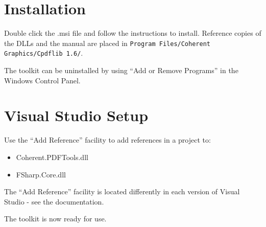 \documentclass[a4paper]{memoir}
\begin{document}
\section{Installation}
Double click the .msi file and follow the instructions to install. Reference copies of the DLLs and the manual are placed in \texttt{Program Files/Coherent Graphics/Cpdflib 1.6/}. 

The toolkit can be uninstalled by using ``Add or Remove Programs'' in the Windows Control Panel.

\section{Visual Studio Setup}
Use the ``Add Reference'' facility to add references in a project to:
\begin{itemize}
\item Coherent.PDFTools.dll
\item FSharp.Core.dll
\end{itemize}

The ``Add Reference'' facility is located differently in each version of Visual Studio - see the documentation.

\vspace{3mm}
\noindent The toolkit is now ready for use.
\end{document}
